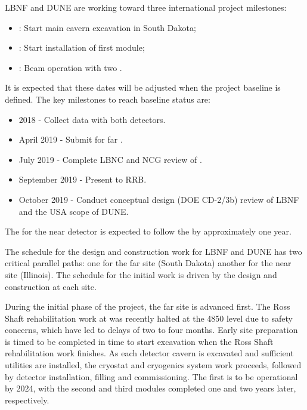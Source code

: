 LBNF and DUNE are working toward three international project milestones:
\begin{itemize}
\item \maincavernstartexc{}: Start main cavern excavation in South Dakota; %
\item \firstfdmodstartinstall{}: Start installation of first  module; 
\item \beamturnon{}: Beam operation with two .
\end{itemize}
It is expected that these dates will be adjusted when the project baseline is defined. The key milestones to reach baseline status are:
\begin{itemize}
\item 2018 - Collect data with both  detectors.
\item April 2019 - Submit  for far .
\item July 2019 - Complete LBNC and NCG review of .
\item September 2019 - Present  to RRB.
\item October 2019 - Conduct conceptual design (DOE CD-2/3b) review of LBNF and the USA scope of DUNE.
\end{itemize}
The  for the near detector is expected to follow the   by approximately one year.

The schedule for the design and construction work for LBNF and DUNE has two critical parallel paths: one for the %
far site (South Dakota) %
another for the %
near site (Illinois). %
The schedule for the initial work is driven by the  design and construction at each site.

During the initial phase of the project, the far site  is advanced first. The Ross Shaft rehabilitation
work at \surf was recently halted at the 4850 level due to safety concerns, which have led to delays of two to four months. Early site preparation is timed to be completed 
in time to start excavation when the Ross Shaft rehabilitation work finishes. As each detector 
 cavern is excavated and sufficient utilities are installed, the cryostat and cryogenics system work proceeds, followed by detector installation, filling and commissioning. 
The first  is to be operational by 2024, with the second and third modules completed one and two years later, respectively.

